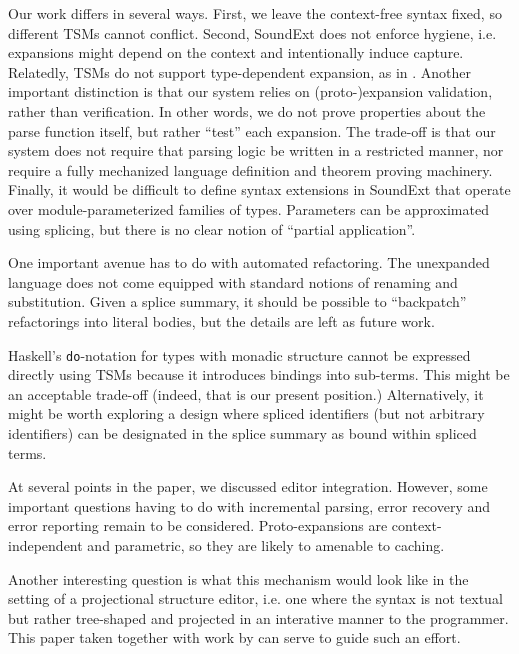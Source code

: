 \documentclass[acmlarge,review,anonymous]{acmart}\settopmatter{printfolios=true}
\newcommand{\li}[1]{\lstinline{#1}}
\begin{document}
Our work differs in several ways. First, we leave the context-free syntax fixed, so different TSMs cannot conflict. Second, SoundExt does not enforce hygiene, i.e. expansions might depend on the context and intentionally induce capture. Relatedly, TSMs do not support type-dependent expansion, as in \cite{conf/popl/LorenzenE16}. Another important distinction is that our system relies on (proto-)expansion validation, rather than verification. In other words, we do not prove properties about the parse function itself, but rather ``test'' each expansion. The trade-off is that our system does not require that parsing logic be written in a restricted manner, nor require a fully mechanized language definition and theorem proving machinery. Finally, it would be difficult to define syntax extensions in SoundExt that operate over module-parameterized families of types. Parameters can be approximated using splicing, but there is no clear notion of ``partial application''.


One important avenue has to do with automated refactoring. The unexpanded language does not come equipped with standard notions of renaming and substitution. Given a splice summary, it should be possible to ``backpatch'' refactorings into literal bodies, but the details are left as future work.

Haskell's \li{do}-notation for types with monadic structure cannot be expressed directly using TSMs because it introduces bindings into sub-terms. This might be an acceptable trade-off (indeed, that is our present position.) Alternatively, it might be worth exploring a design where spliced identifiers (but not arbitrary identifiers) can be designated in the splice summary as bound within spliced terms.

At several points in the paper, we discussed editor integration. However, some important questions having to do with incremental parsing, error recovery and error reporting remain to be considered. Proto-expansions are context-independent and parametric, so they are likely to amenable to caching.

Another interesting question is what this mechanism would look like in the setting of a projectional structure editor, i.e. one where the syntax is not textual but rather tree-shaped and projected in an interative manner to the programmer. This paper taken together with work by \citet{Omar:2012:ACC:2337223.2337324,DBLP:conf/popl/OmarVHAH17} can serve to guide such an effort.
\end{document}
